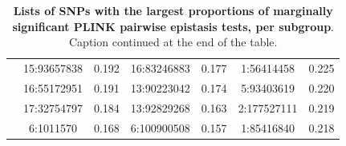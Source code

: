 \documentclass[12pt,a4paper]{article}
\begin{document}
\begin{landscape}
\begin{table}[ht]
\begin{tabular}{ccccccc}
  & 15:93657838 & 0.192 & 16:83246883 & 0.177 & 1:56414458 & 0.225 \\ 
  & 16:55172951 & 0.191 & 13:90223042 & 0.174 & 5:93403619 & 0.220 \\ 
  & 17:32754797 & 0.184 & 13:92829268 & 0.163 & 2:177527111 & 0.219 \\ 
  & 6:1011570 & 0.168 & 6:100900508 & 0.157 & 1:85416840 & 0.218 \\
   \hline
\end{tabular}
\caption[TBD]{\textbf{Lists of SNPs with the largest proportions of marginally significant PLINK pairwise epistasis tests, per subgroup}. Caption continued at the end of the table.}
\label{InterPath-Supp-Table-PLINK-Proportions-TopSNPs-a}
\end{table}
\end{landscape}
\clearpage
\setlength{\footskip}{1cm}
\addtocounter{table}{-1}
\end{document}
